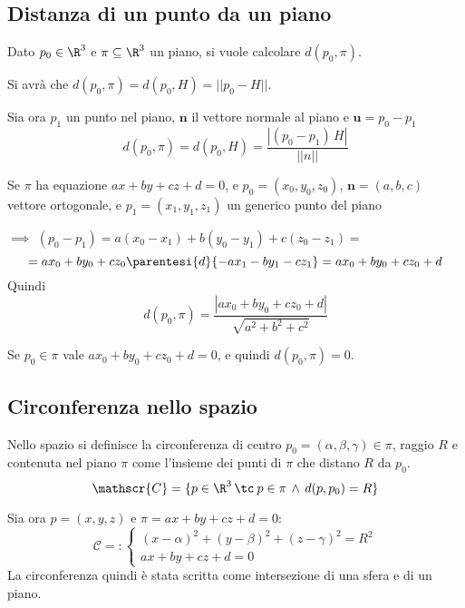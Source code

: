 \subsection{Distanza di un punto da un piano}

Dato $ p_0 \in\R^{3} $ e $ \pi \subseteq \R^{3} $ un piano, si vuole calcolare $ d(p_0, \pi) $.

Si avrà che $ d(p_0, \pi)=d(p_0, H)=||p_0-H|| $.

Sia ora $ p_1 $ un punto nel piano, $ \mathbf{n} $ il vettore normale al piano e $ \mathbf{u}=p_0-p_1 $ \[
    d(p_0, \pi)=d(p_0, H) = \frac{|(p_0-p_1)\,H|}{||n||}
\]

Se $ \pi $ ha equazione $ ax+by+cz+d=0 $, e $ p_0=(x_0,y_0,z_0) $, $ \mathbf{n}=(a,b,c) $ vettore ortogonale, e $ p_1=(x_1,y_1,z_1) $ un generico punto del piano 

$\implies$ $ (p_0-p_1)=a(x_0-x_1)+b(y_0-y_1)+c(z_0-z_1)= $ \[
    = ax_0+by_0+cz_0\parentesi{d}{-ax_1-by_1-cz_1}=ax_0+by_0+cz_0+d
\]
Quindi \begin{equation}
    d(p_0, \pi)=\frac{|ax_0+by_0+cz_0+d|}{\sqrt{a^{2}+b^{2}+c^{2}}}
\end{equation}

Se $ p_0 \in \pi $ vale $ ax_0+by_0+cz_0+d=0 $, e quindi $ d(p_0, \pi)=0 $.


\subsection{Circonferenza nello spazio}

Nello spazio si definisce la circonferenza di centro $ p_0=(\alpha, \beta, \gamma) \in \pi $, raggio $ R $ e contenuta nel piano $ \pi $ come l'insieme dei punti di $ \pi $ che distano $ R $ da $ p_0 $.
\[
    \mathscr{C} = \{p \in \R^{3}\,\tc\: p \in \pi \,\land\, d(p,p_0)=R\}
\]

Sia ora $ p=(x,y,z) $ e $ \pi=ax+by+cz+d=0 $: \[
    \mathscr{C}= :\begin{cases}
        (x-\alpha)^{2}+(y-\beta)^{2}+(z-\gamma)^{2}=R^{2}\\
        ax+by+cz+d=0
    \end{cases}
\]
La circonferenza quindi è stata scritta come intersezione di una sfera e di un piano.

